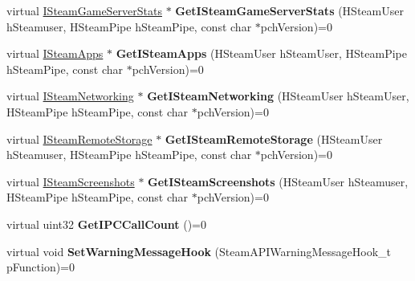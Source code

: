 \begin{DoxyCompactItemize}
\mbox{\label{class_i_steam_client_a6316ed5714844a65a4ad92d12c935a91}} 
virtual \hyperlink{class_i_steam_game_server_stats}{I\+Steam\+Game\+Server\+Stats} $\ast$ {\bfseries Get\+I\+Steam\+Game\+Server\+Stats} (H\+Steam\+User h\+Steamuser, H\+Steam\+Pipe h\+Steam\+Pipe, const char $\ast$pch\+Version)=0
\item 
\mbox{\label{class_i_steam_client_a24f3e6244221d1c0a88b012cb559431d}} 
virtual \hyperlink{class_i_steam_apps}{I\+Steam\+Apps} $\ast$ {\bfseries Get\+I\+Steam\+Apps} (H\+Steam\+User h\+Steam\+User, H\+Steam\+Pipe h\+Steam\+Pipe, const char $\ast$pch\+Version)=0
\item 
\mbox{\label{class_i_steam_client_a5b6ec0445c5d2b201c1e288e4c3cce0f}} 
virtual \hyperlink{class_i_steam_networking}{I\+Steam\+Networking} $\ast$ {\bfseries Get\+I\+Steam\+Networking} (H\+Steam\+User h\+Steam\+User, H\+Steam\+Pipe h\+Steam\+Pipe, const char $\ast$pch\+Version)=0
\item 
\mbox{\label{class_i_steam_client_ae8f418face2268f97d3cc8bf3c218b3e}} 
virtual \hyperlink{class_i_steam_remote_storage}{I\+Steam\+Remote\+Storage} $\ast$ {\bfseries Get\+I\+Steam\+Remote\+Storage} (H\+Steam\+User h\+Steamuser, H\+Steam\+Pipe h\+Steam\+Pipe, const char $\ast$pch\+Version)=0
\item 
\mbox{\label{class_i_steam_client_a49f324188e527bf77ec96550e3fed294}} 
virtual \hyperlink{class_i_steam_screenshots}{I\+Steam\+Screenshots} $\ast$ {\bfseries Get\+I\+Steam\+Screenshots} (H\+Steam\+User h\+Steamuser, H\+Steam\+Pipe h\+Steam\+Pipe, const char $\ast$pch\+Version)=0
\item 
\mbox{\label{class_i_steam_client_a65968ceb6cde78ac0f661d2560a71c1d}} 
virtual uint32 {\bfseries Get\+I\+P\+C\+Call\+Count} ()=0
\item 
\mbox{\label{class_i_steam_client_a3ed1292f4e10c9817a7f58d78661979d}} 
virtual void {\bfseries Set\+Warning\+Message\+Hook} (Steam\+A\+P\+I\+Warning\+Message\+Hook\+\_\+t p\+Function)=0
\item 
\mbox{\label{class_i_steam_client_a17835d1bba0fc6b9ca901034159538ff}} 

\end{DoxyCompactItemize}
